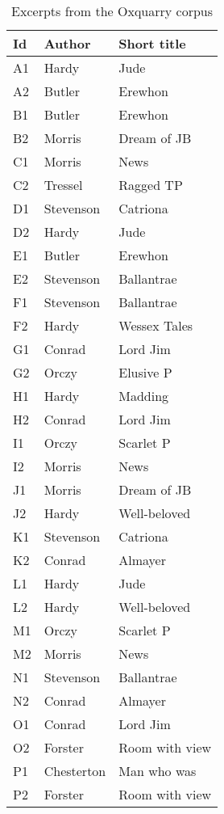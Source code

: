 \begin{table}[H]
  \small
  \centering
  \caption{Excerpts from the Oxquarry corpus}
  \label{tbl:oxquarry_corpus}

  \begin{tabular}{l l l}
    \toprule
    \textbf{Id} &
    \textbf{Author} &
    \textbf{Short title} \\
    \midrule
    A1 & Hardy & Jude \\
    A2 & Butler & Erewhon \\
    B1 & Butler & Erewhon \\
    B2 & Morris & Dream of JB \\
    C1 & Morris & News \\
    C2 & Tressel & Ragged TP \\
    D1 & Stevenson & Catriona \\
    D2 & Hardy & Jude \\
    E1 & Butler & Erewhon \\
    E2 & Stevenson & Ballantrae \\
    F1 & Stevenson & Ballantrae \\
    F2 & Hardy & Wessex Tales \\
    G1 & Conrad & Lord Jim \\
    G2 & Orczy & Elusive P \\
    H1 & Hardy & Madding \\
    H2 & Conrad & Lord Jim \\
    I1 & Orczy & Scarlet P \\
    I2 & Morris & News \\
    J1 & Morris & Dream of JB \\
    J2 & Hardy & Well-beloved \\
    K1 & Stevenson & Catriona \\
    K2 & Conrad & Almayer \\
    L1 & Hardy & Jude \\
    L2 & Hardy & Well-beloved \\
    M1 & Orczy & Scarlet P \\
    M2 & Morris & News \\
    N1 & Stevenson & Ballantrae \\
    N2 & Conrad & Almayer \\
    O1 & Conrad & Lord Jim \\
    O2 & Forster & Room with view \\
    P1 & Chesterton & Man who was \\
    P2 & Forster & Room with view \\

\end{tabular}
\end{table}
